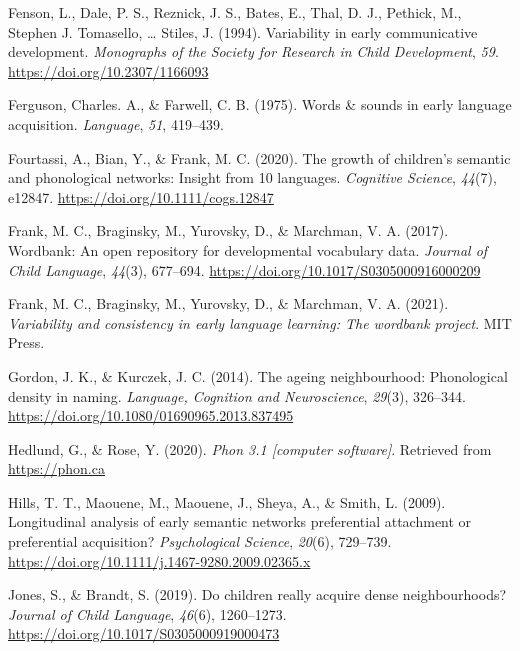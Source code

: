 \documentclass[
  man]{apa6}
\newlength{\cslhangindent}
\newlength{\cslentryspacingunit} %
\newenvironment{CSLReferences}[2] %
 {%
  \setlength{\parindent}{0pt}
  \ifodd #1
  \let\oldpar\par
  \def\par{\hangindent=\cslhangindent\oldpar}
  \fi
  \setlength{\parskip}{#2\cslentryspacingunit}
 }%
 {}
\begin{document}
\begin{CSLReferences}{1}{0}
\leavevmode{}%
Fenson, L., Dale, P. S., Reznick, J. S., Bates, E., Thal, D. J., Pethick, M., Stephen J. Tomasello, \ldots{} Stiles, J. (1994). Variability in early communicative development. \emph{Monographs of the Society for Research in Child Development}, \emph{59}. \url{https://doi.org/10.2307/1166093}

\leavevmode{}%
Ferguson, Charles. A., \& Farwell, C. B. (1975). Words \& sounds in early language acquisition. \emph{Language}, \emph{51}, 419--439.

\leavevmode{}%
Fourtassi, A., Bian, Y., \& Frank, M. C. (2020). The growth of children's semantic and phonological networks: Insight from 10 languages. \emph{Cognitive Science}, \emph{44}(7), e12847. \url{https://doi.org/10.1111/cogs.12847}

\leavevmode{}%
Frank, M. C., Braginsky, M., Yurovsky, D., \& Marchman, V. A. (2017). Wordbank: An open repository for developmental vocabulary data. \emph{Journal of Child Language}, \emph{44}(3), 677--694. \url{https://doi.org/10.1017/S0305000916000209}

\leavevmode{}%
Frank, M. C., Braginsky, M., Yurovsky, D., \& Marchman, V. A. (2021). \emph{Variability and consistency in early language learning: The wordbank project}. {MIT} Press.

\leavevmode{}%
Gordon, J. K., \& Kurczek, J. C. (2014). The ageing neighbourhood: Phonological density in naming. \emph{Language, Cognition and Neuroscience}, \emph{29}(3), 326--344. \url{https://doi.org/10.1080/01690965.2013.837495}

\leavevmode{}%
Hedlund, G., \& Rose, Y. (2020). \emph{Phon 3.1 {[}computer software{]}}. Retrieved from \url{https://phon.ca}

\leavevmode{}%
Hills, T. T., Maouene, M., Maouene, J., Sheya, A., \& Smith, L. (2009). Longitudinal analysis of early semantic networks preferential attachment or preferential acquisition? \emph{Psychological Science}, \emph{20}(6), 729--739. \url{https://doi.org/10.1111/j.1467-9280.2009.02365.x}

\leavevmode{}%
Jones, S., \& Brandt, S. (2019). Do children really acquire dense neighbourhoods? \emph{Journal of Child Language}, \emph{46}(6), 1260--1273. \url{https://doi.org/10.1017/S0305000919000473}


\end{CSLReferences}
\end{document}
